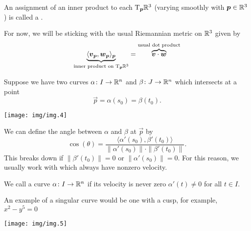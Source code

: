 \begin{definition}
An assignment of an inner product to each $\mathrm{T}_{\boldsymbol{p}}\mathbb{R}^{3}$ (varying
smoothly with $\boldsymbol{p}\in\mathbb{R}^{3}$) is called a .
\end{definition}

\begin{example}
For now, we will be sticking with the usual Riemannian metric on
$\mathbb{R}^{3}$ given by
\begin{equation}
\underbrace{\langle\boldsymbol{v}_{\boldsymbol{p}},\boldsymbol{w}_{\boldsymbol{p}}\rangle_{\boldsymbol{p}}}_{\text{inner product on }\mathrm{T}_{\boldsymbol{p}}\mathbb{R}^{3}}=
\overbrace{\boldsymbol{v}\cdot\boldsymbol{w}}^{\text{usual dot product}}
\end{equation}
\end{example}

\begin{example}
  Suppose we have two curves $\alpha\colon I\to \mathbb{R}^{n}$ and
  $\beta\colon J\to\mathbb{R}^{n}$ which intersects at a point
  \begin{equation}
\vec{p} = \alpha(s_{0}) = \beta(t_{0}).
  \end{equation}
\begin{center}
\texttt{[image: img/img.4]}
\end{center}
We can define the angle between $\alpha$ and $\beta$ at $\vec{p}$ by
\begin{equation}
  \cos(\theta) = \frac{\langle\alpha'(s_{0}),\beta'(t_{0})\rangle}{\|\alpha'(s_{0})\|\cdot\|\beta'(t_{0})\|}.
\end{equation}
This breaks down if $\|\beta'(t_{0})\|=0$ or $\|\alpha'(s_{0})\|=0$.
For this reason, we usually work with  which always have
nonzero velocity.
\end{example}

\begin{definition}
We call a curve $\alpha\colon I\to\mathbb{R}^{n}$  if its
velocity is never zero $\alpha'(t)\neq 0$ for all $t\in I$.
\end{definition}

\begin{example}
  An example of a singular curve would be one with a cusp, for example,
  $x^{2}-y^{5}=0$

\begin{center}
  \texttt{[image: img/img.5]}
\end{center}
\end{example}

